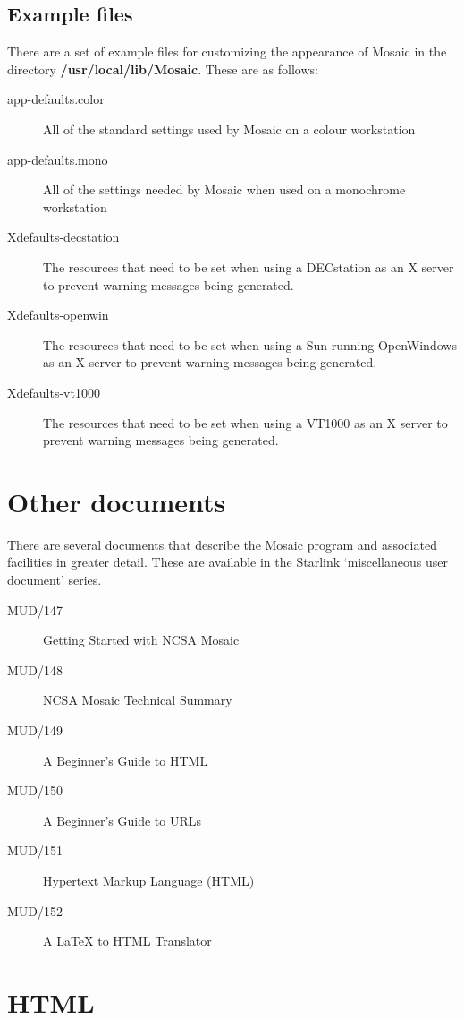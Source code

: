 \subsection{Example files}

There are a set of example files for customizing the appearance of Mosaic in
the directory {\bf /usr/local/lib/Mosaic}. These are as follows:

\begin{description}
\item[app-defaults.color] All of the standard settings used by Mosaic on a
colour workstation
\item[app-defaults.mono] All of the settings needed by Mosaic when used on a
monochrome workstation
\item[Xdefaults-decstation] The resources that need to be set when using a
DECstation as an X server to prevent warning messages being generated.
\item[Xdefaults-openwin] The resources that need to be set when using a Sun
running OpenWindows as an X server to prevent warning messages being generated.
\item[Xdefaults-vt1000] The resources that need to be set when using a
VT1000 as an X server to prevent warning messages being generated.
\end{description}


\section{Other documents}
\label{muds}

There are several documents that describe the Mosaic program and associated
facilities in greater detail. These are available in the Starlink
`miscellaneous user document' series.

\begin{description}
\item[MUD/147] Getting Started with NCSA Mosaic
\item[MUD/148] NCSA Mosaic Technical Summary
\item[MUD/149] A Beginner's Guide to HTML
\item[MUD/150] A Beginner's Guide to URLs
\item[MUD/151] Hypertext Markup Language (HTML)
\item[MUD/152] A LaTeX to HTML Translator
\end{description}

\appendix

\section{HTML}

